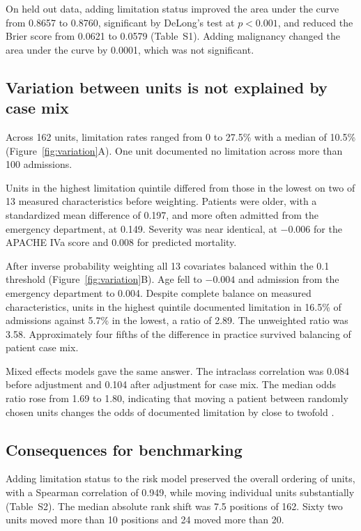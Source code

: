 \documentclass[12pt,a4paper]{article}
\begin{document}
On held out data, adding limitation status improved the area under the curve from
0.8657 to 0.8760, significant by DeLong's test at $p<0.001$, and reduced the
Brier score from 0.0621 to 0.0579 (Table~S1). Adding malignancy
changed the area under the curve by 0.0001, which was not significant.

\subsection*{Variation between units is not explained by case mix}
Across 162 units, limitation rates ranged from 0 to 27.5\% with a median of
10.5\% (Figure~\ref{fig:variation}A). One unit documented no limitation across
more than 100 admissions.

Units in the highest limitation quintile differed from those in the lowest on two
of 13 measured characteristics before weighting. Patients were older, with a
standardized mean difference of 0.197, and more often admitted from the emergency
department, at 0.149. Severity was near identical, at $-0.006$ for the APACHE IVa
score and 0.008 for predicted mortality.

After inverse probability weighting all 13 covariates balanced within the 0.1
threshold (Figure~\ref{fig:variation}B). Age fell to $-0.004$ and admission from
the emergency department to 0.004. Despite complete balance on measured
characteristics, units in the highest quintile documented limitation in 16.5\% of
admissions against 5.7\% in the lowest, a ratio of 2.89. The unweighted ratio was
3.58. Approximately four fifths of the difference in practice survived balancing
of patient case mix.

Mixed effects models gave the same answer. The intraclass correlation was 0.084
before adjustment and 0.104 after adjustment for case mix. The median odds ratio
rose from 1.69 to 1.80, indicating that moving a patient between randomly chosen
units changes the odds of documented limitation by close to twofold
\cite{ref39}.

\subsection*{Consequences for benchmarking}
Adding limitation status to the risk model preserved the overall ordering of
units, with a Spearman correlation of 0.949, while moving individual units
substantially (Table~S2). The median absolute rank shift was 7.5
positions of 162. Sixty two units moved more than 10 positions and 24 moved more
than 20.
\end{document}
